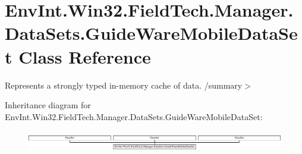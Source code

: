 \hypertarget{class_env_int_1_1_win32_1_1_field_tech_1_1_manager_1_1_data_sets_1_1_guide_ware_mobile_data_set}{}\section{Env\+Int.\+Win32.\+Field\+Tech.\+Manager.\+Data\+Sets.\+Guide\+Ware\+Mobile\+Data\+Set Class Reference}
\label{class_env_int_1_1_win32_1_1_field_tech_1_1_manager_1_1_data_sets_1_1_guide_ware_mobile_data_set}


Represents a strongly typed in-\/memory cache of data. /summary$>$  


Inheritance diagram for Env\+Int.\+Win32.\+Field\+Tech.\+Manager.\+Data\+Sets.\+Guide\+Ware\+Mobile\+Data\+Set\+:\begin{figure}[H]
\begin{center}
\leavevmode
\includegraphics[height=0.906149cm]{class_env_int_1_1_win32_1_1_field_tech_1_1_manager_1_1_data_sets_1_1_guide_ware_mobile_data_set}
\end{center}
\end{figure}
